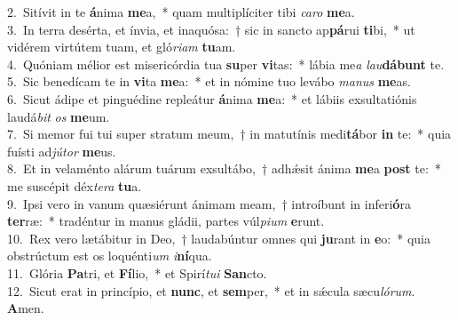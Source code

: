 {2.~}Sitívit in te \textbf{á}nima \textbf{me}a,~* quam multiplíciter tibi \textit{ca}\textit{ro} \textbf{me}a.\\
{3.~}In terra desérta, et ínvia, et inaquósa:~† sic in sancto ap\textbf{pá}rui \textbf{ti}bi,~* ut vidérem virtútem tuam, et gló\textit{ri}\textit{am} \textbf{tu}am.\\
{4.~}Quóniam mélior est misericórdia tua \textbf{su}per \textbf{vi}tas:~* lábia me\textit{a} \textit{lau}\textbf{dá}\textbf{bunt} te.\\
{5.~}Sic benedícam te in \textbf{vi}ta \textbf{me}a:~* et in nómine tuo levábo \textit{ma}\textit{nus} \textbf{me}as.\\
{6.~}Sicut ádipe et pinguédine repleátur \textbf{á}nima \textbf{me}a:~* et lábiis exsultatiónis laudá\textit{bit} \textit{os} \textbf{me}um.\\
{7.~}Si memor fui tui super stratum meum,~† in matutínis medi\textbf{tá}bor \textbf{in} te:~* quia fuísti ad\textit{jú}\textit{tor} \textbf{me}us.\\
{8.~}Et in velaménto alárum tuárum exsultábo,~† adhǽsit ánima \textbf{me}a \textbf{post} te:~* me suscépit déx\textit{te}\textit{ra} \textbf{tu}a.\\
{9.~}Ipsi vero in vanum quæsiérunt ánimam meam,~† introíbunt in inferi\textbf{ó}ra \textbf{ter}ræ:~* tradéntur in manus gládii, partes vúl\textit{pi}\textit{um} \textbf{e}runt.\\
{10.~}Rex vero lætábitur in Deo,~† laudabúntur omnes qui \textbf{ju}rant in \textbf{e}o:~* quia obstrúctum est os loquénti\textit{um} \textit{i}\textbf{ní}qua.\\
{11.~}Glória \textbf{Pa}tri, et \textbf{Fí}lio,~* et Spirí\textit{tu}\textit{i} \textbf{San}cto.\\
{12.~}Sicut erat in princípio, et \textbf{nunc}, et \textbf{sem}per,~* et in sǽcula sæcu\textit{ló}\textit{rum}. \textbf{A}men.\\

